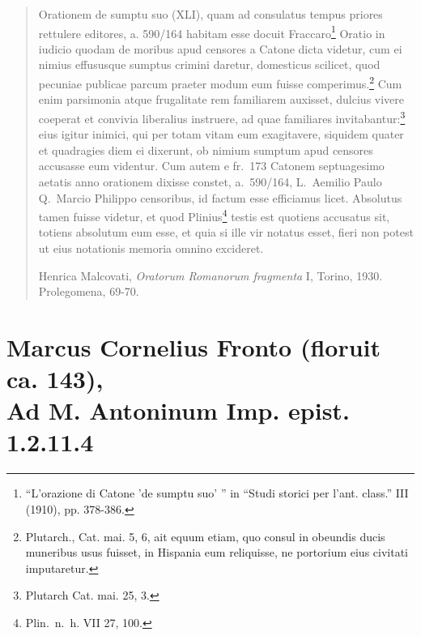 

\begin{quotation}
\noindent Orationem de sumptu suo (XLI), quam ad consulatus tempus priores rettulere editores, a. 590/164 habitam esse docuit Fraccaro\footnote{``L'orazione di Catone 'de sumptu suo' '' in ``Studi storici per l'ant. class.'' III (1910), pp. 378-386.} Oratio in iudicio quodam de moribus apud censores a Catone dicta videtur, cum ei nimius effususque sumptus crimini daretur, domesticus scilicet, quod pecuniae publicae parcum praeter modum eum fuisse comperimus.\footnote{Plutarch., Cat. mai. 5, 6, ait equum etiam, quo consul in obeundis ducis muneribus usus fuisset, in Hispania eum reliquisse, ne portorium eius civitati imputaretur.} Cum enim parsimonia atque frugalitate rem familiarem auxisset, dulcius vivere coeperat et convivia liberalius instruere, ad quae familiares invitabantur:\footnote{Plutarch Cat. mai. 25, 3.} eius igitur inimici, qui per totam vitam eum exagitavere, siquidem quater et quadragies diem ei dixerunt, ob nimium sumptum apud censores accusasse eum videntur. Cum autem e fr.\ 173 Catonem septuagesimo aetatis anno orationem dixisse constet, a.~590/164, L.\ Aemilio Paulo Q.\ Marcio Philippo censoribus, id factum esse efficiamus licet. Absolutus tamen fuisse videtur, et quod Plinius\footnote{Plin.\ n.\ h. VII 27, 100.} testis est quotiens accusatus sit, totiens absolutum eum esse, et quia si ille vir notatus esset, fieri non potest ut eius notationis memoria omnino excideret.

\noindent Henrica Malcovati, \textit{Oratorum Romanorum fragmenta} I, Torino, 1930. Prolegomena, 69-70.

\end{quotation}


\section*{Marcus Cornelius Fronto (floruit ca. 143), \\Ad M. Antoninum Imp. epist. 1.2.11.4}


